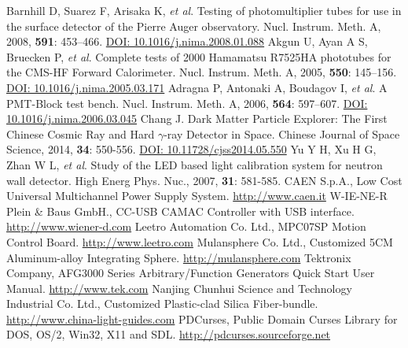 \documentclass{nst}
\begin{document}
\begin{thebibliography}{99}
	 Barnhill D, Suarez F, Arisaka K, \emph{et al}. Testing of photomultiplier tubes for use in the surface detector of the {Pierre} {Auger} observatory. Nucl. Instrum. Meth. A, 2008, {\bf 591}: 453--466.
	\href{http://dx.doi.org/10.1016/j.nima.2008.01.088}{DOI: 10.1016/j.nima.2008.01.088}
	 Akgun U, Ayan A S, Bruecken P, \emph{et al}. Complete tests of 2000 {Hamamatsu} {R}7525HA phototubes for the {CMS}-{HF} {Forward} {Calorimeter}. Nucl. Instrum. Meth. A, 2005, {\bf 550}: 145--156.
	\href{http://dx.doi.org/10.1016/j.nima.2005.03.171}{DOI: 10.1016/j.nima.2005.03.171}
	 Adragna P, Antonaki A, Boudagov I, \emph{et al}. A {PMT}-{Block} test bench. Nucl. Instrum. Meth. A, 2006, {\bf 564}: 597--607.
	\href{http://dx.doi.org/10.1016/j.nima.2006.03.045}{DOI: 10.1016/j.nima.2006.03.045}
	 Chang J. Dark Matter Particle Explorer: The First Chinese Cosmic Ray and Hard $\gamma$-ray Detector in Space. Chinese Journal of Space Science, 2014, {\bf 34}: 550-556.
	\href{http://dx.doi.org/10.11728/cjss2014.05.550}{DOI: 10.11728/cjss2014.05.550}
	 Yu Y H, Xu H G, Zhan W L, \emph{et al}. Study of the LED based light calibration system for neutron wall detector. High Energ Phys. Nuc., 2007, {\bf 31}: 581-585.
	 {CAEN S.p.A.}, Low Cost Universal Multichannel Power Supply System. \href{http://www.caen.it/csite/CaenProd.jsp?idmod=491&parent=20}{http://www.caen.it}
	 {W-IE-NE-R Plein \& Baus GmbH.}, {CC-USB CAMAC Controller with USB interface}. \href{http://www.wiener-d.com/sc/modules/camac--modules/cc-usb.html}{http://www.wiener-d.com}
	 {Leetro Automation Co. Ltd.}, {MPC07SP Motion Control Board}. \href{http://www.leetro.com/english/}{http://www.leetro.com}
	 {Mulansphere Co. Ltd.}, {Customized 5CM Aluminum-alloy Integrating Sphere}. \href{http://mulansphere.com/e-index.html/}{http://mulansphere.com}
	 {Tektronix Company}, {AFG3000 Series Arbitrary/Function Generators Quick Start User Manual}. \href{http://www.tek.com/signal-generator/afg3000-function-generator/}{http://www.tek.com}
	 Nanjing Chunhui Science and Technology Industrial Co. Ltd., Customized Plastic-clad Silica Fiber-bundle.  \href{http://www.china-light-guides.com/}{http://www.china-light-guides.com}
	 PDCurses,  Public Domain Curses Library for DOS, OS/2, Win32, X11 and SDL. \href{http://pdcurses.sourceforge.net/}{http://pdcurses.sourceforge.net}

\end{thebibliography}
\end{document}
